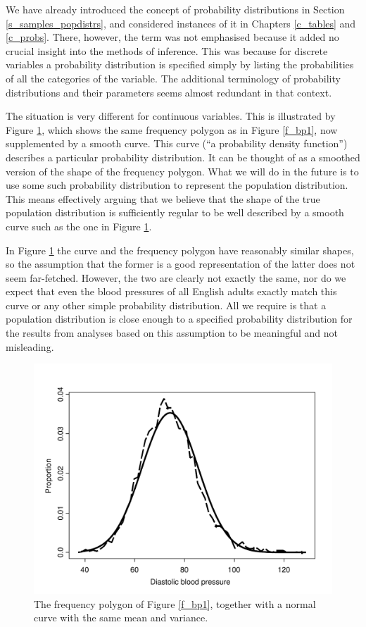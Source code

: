 We have already introduced the concept of probability distributions in
Section \ref{s_samples_popdistrs},  and considered instances of it in
Chapters \ref{c_tables} and \ref{c_probs}. There, however, the term was
not emphasised because it added no crucial insight into the
methods of inference. This was because for discrete variables a
probability distribution is specified simply by listing the
probabilities of all the categories of the variable. The additional
terminology of probability distributions and their parameters seems
almost redundant in that context.

The situation is very different for continuous variables. This is
illustrated by Figure \ref{f_bp2}, which shows the same frequency
polygon as in Figure \ref{f_bp1}, now supplemented by a
smooth curve. This curve (``a probability density
function'') describes a particular probability distribution. It can be
thought of as a smoothed version of the shape of the frequency polygon.
What we will do in the future is to use some such probability
distribution to represent the population distribution. This means
effectively arguing that we believe that the shape of the true
population distribution is sufficiently regular to be well described by
a smooth curve such as the one in Figure \ref{f_bp2}.

In Figure \ref{f_bp2} the curve and the frequency polygon have
reasonably similar shapes, so the assumption that the former is a
good representation of the latter does not seem far-fetched. However, the two are
clearly not exactly the same, \label{p_model2} nor do we expect that
even the blood pressures of all English adults exactly match
this curve or any other
simple probability distribution. All we require is that a
population distribution is close enough to a specified probability
distribution for the results from analyses based on this assumption to
be meaningful and not misleading.


\begin{figure}
\caption{The frequency polygon of Figure \ref{f_bp1},
together with a normal curve with the same mean and variance.}
\label{f_bp2}
\begin{center}

\includegraphics[width=11.5cm]{bloodp2}
\end{center}

\end{figure}

